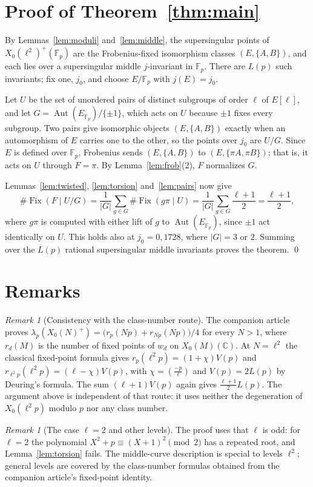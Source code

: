 \documentclass[11pt,a4paper]{article}
\theoremstyle{remark}\newtheorem{remark}[theorem]{Remark}
\numberwithin{equation}{section}
\newcommand{\Fp}{\mathbb F_p}
\newcommand{\kk}{\overline{\mathbb F}_p}
\newcommand{\Fix}{\operatorname{Fix}}
\newcommand{\Aut}{\operatorname{Aut}}
\newcommand{\leg}[2]{\left(\frac{#1}{#2}\right)}
\begin{document}
\section{Proof of Theorem~\ref{thm:main}}
By Lemmas~\ref{lem:moduli} and~\ref{lem:middle}, the supersingular points of $X_0(\ell^2)^+(\Fp)$ are the Frobenius-fixed isomorphism classes $(E,\{A,B\})$, and each lies over a supersingular middle $j$-invariant in $\Fp$. There are $L(p)$ such invariants; fix one, $j_0$, and choose $E/\Fp$ with $j(E)=j_0$.

Let $U$ be the set of unordered pairs of distinct subgroups of order $\ell$ of $E[\ell]$, and let $G=\Aut(E_{\kk})/\{\pm1\}$, which acts on $U$ because $\pm1$ fixes every subgroup. Two pairs give isomorphic objects $(E,\{A,B\})$ exactly when an automorphism of $E$ carries one to the other, so the points over $j_0$ are $U/G$. Since $E$ is defined over $\Fp$, Frobenius sends $(E,\{A,B\})$ to $(E,\{\pi A,\pi B\})$; that is, it acts on $U$ through $F=\pi$. By Lemma~\ref{lem:frob}(2), $F$ normalizes $G$.

Lemmas~\ref{lem:twisted}, \ref{lem:torsion} and~\ref{lem:pairs} now give
\[
\#\Fix(F\mid U/G)=\frac1{|G|}\sum_{g\in G}\#\Fix(g\pi\mid U)=\frac1{|G|}\sum_{g\in G}\frac{\ell+1}{2}=\frac{\ell+1}{2},
\]
where $g\pi$ is computed with either lift of $g$ to $\Aut(E_{\kk})$, since $\pm1$ act identically on $U$. This holds also at $j_0=0,1728$, where $|G|=3$ or $2$. Summing over the $L(p)$ rational supersingular middle invariants proves the theorem. \qed

\section{Remarks}
\begin{remark}[Consistency with the class-number route]
The companion article proves $\lambda_p(X_0(N)^+)=\bigl(r_p(Np)+r_{Np}(Np)\bigr)/4$ for every $N>1$, where $r_d(M)$ is the number of fixed points of $w_d$ on $X_0(M)(\mathbb C)$. At $N=\ell^2$ the classical fixed-point formula gives $r_p(\ell^2p)=(1+\chi)V(p)$ and $r_{\ell^2p}(\ell^2p)=(\ell-\chi)V(p)$, with $\chi=\leg{-p}{\ell}$ and $V(p)=2L(p)$ by Deuring's formula. The sum $(\ell+1)V(p)$ again gives $\frac{\ell+1}{2}L(p)$. The argument above is independent of that route: it uses neither the degeneration of $X_0(\ell^2p)$ modulo $p$ nor any class number.
\end{remark}

\begin{remark}[The case $\ell=2$ and other levels]
The proof uses that $\ell$ is odd: for $\ell=2$ the polynomial $X^2+p\equiv(X+1)^2\pmod 2$ has a repeated root, and Lemma~\ref{lem:torsion} fails. The middle-curve description is special to levels $\ell^2$; general levels are covered by the class-number formulas obtained from the companion article's fixed-point identity.
\end{remark}
\end{document}
